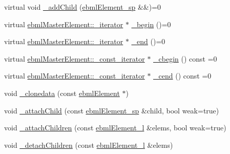 \begin{DoxyCompactItemize}
\item 
virtual void \mbox{\hyperlink{classebml_1_1ebmlMasterElement_a3af0270846a1ced1719d26dd261f0355}{\+\_\+add\+Child}} (\mbox{\hyperlink{namespaceebml_adad533b7705a16bb360fe56380c5e7be}{ebml\+Element\+\_\+sp}} \&\&)=0
\item 
virtual \mbox{\hyperlink{classebml_1_1ebmlMasterElement_1_1__iterator}{ebml\+Master\+Element\+::\+\_\+iterator}} $\ast$ \mbox{\hyperlink{classebml_1_1ebmlMasterElement_af6fb7a9934e9b8d0c64273ef6944f44b}{\+\_\+begin}} ()=0
\item 
virtual \mbox{\hyperlink{classebml_1_1ebmlMasterElement_1_1__iterator}{ebml\+Master\+Element\+::\+\_\+iterator}} $\ast$ \mbox{\hyperlink{classebml_1_1ebmlMasterElement_a352e5e11836063394990cb05c09d8e48}{\+\_\+end}} ()=0
\item 
virtual \mbox{\hyperlink{classebml_1_1ebmlMasterElement_1_1__const__iterator}{ebml\+Master\+Element\+::\+\_\+const\+\_\+iterator}} $\ast$ \mbox{\hyperlink{classebml_1_1ebmlMasterElement_a7e1ffa498e22b637a6671df14aa0bc45}{\+\_\+cbegin}} () const =0
\item 
virtual \mbox{\hyperlink{classebml_1_1ebmlMasterElement_1_1__const__iterator}{ebml\+Master\+Element\+::\+\_\+const\+\_\+iterator}} $\ast$ \mbox{\hyperlink{classebml_1_1ebmlMasterElement_ae6cdbf68d8267a7ab098bd402fa70e88}{\+\_\+cend}} () const =0
\item 
void \mbox{\hyperlink{classebml_1_1ebmlMasterElement_a9bde42f70ab39592c4dccb6bf04904d4}{\+\_\+clonedata}} (const \mbox{\hyperlink{classebml_1_1ebmlElement}{ebml\+Element}} $\ast$)
\item 
void \mbox{\hyperlink{classebml_1_1ebmlMasterElement_a16b141ac7d241a9b95c029761fdfc02f}{\+\_\+attach\+Child}} (const \mbox{\hyperlink{namespaceebml_adad533b7705a16bb360fe56380c5e7be}{ebml\+Element\+\_\+sp}} \&child, bool weak=true)
\item 
void \mbox{\hyperlink{classebml_1_1ebmlMasterElement_ad4a20efe80537fde72af4584f67fb645}{\+\_\+attach\+Children}} (const \mbox{\hyperlink{namespaceebml_a1ddadd26791f273d851882653b9caf70}{ebml\+Element\+\_\+l}} \&elems, bool weak=true)
\item 
void \mbox{\hyperlink{classebml_1_1ebmlMasterElement_a3102fb532e6701cfeecf3877dbb43da3}{\+\_\+detach\+Children}} (const \mbox{\hyperlink{namespaceebml_a1ddadd26791f273d851882653b9caf70}{ebml\+Element\+\_\+l}} \&elems)
\end{DoxyCompactItemize}
